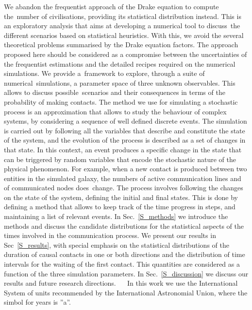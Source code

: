\documentclass[crop]{CSLB}
\begin{document}
We abandon the frequentist approach of the Drake equation to
compute the number of civilisations, providing its statistical
distribution instead.
%
This is an exploratory analysis that aims at developing a numerical
tool to discuss the different scenarios based on statistical
heuristics.
%
With this, we avoid the several theoretical problems
summarised by the Drake equation factors.
%
The approach proposed here should be considered as a compromise
between the uncertainties of the frequentist estimations and the detailed
recipes required on the numerical simulations.
%
We provide a framework to explore, through a suite of
numerical simulations, a parameter space of three unknown observables.
%
This allows to discuss possible scenarios and their consequences in
terms of the probability of making contacts.
%
The method we use for simulating a stochastic process is an
approximation that allows to study the behaviour of complex systems,
by considering a sequence of well defined discrete events.
%
The simulation is carried out by following all the variables that
describe and constitute the state of the system, and the evolution of
the process is described as a set of changes in that state.
%
In this context, an event produces a specific change in the state that
can be triggered by random variables that encode the stochastic nature
of the physical phenomenon.
%
For example, when a new contact is produced between two entities in
the simulated galaxy, the numbers of active communication lines and of
communicated nodes does change.
%
The process involves following the changes on the state of the system,
defining the initial and final states.
%
This is done by defining a method that allows to keep track of the
time progress in steps, and maintaining a list of relevant events.
%
In Sec.~\ref{S_methods} we introduce the methods and discuss the
candidate distributions for the statistical aspects of the times
involved in the communication process.
%
We present our results in Sec~\ref{S_results}, with special emphasis
on the statistical distributions of the duration of causal contacts in
one or both directions and the distribution of time intervals for the
waiting of the first contact.
%
This quantities are considered as a function of the three simulation
parameters.
%
In Sec.~\ref{S_discussion} we discuss our results and future research
directions.   
%
In this work we use the International System of units recommended by
the International Astronomial Union, where the simbol for years is
''a''.
\end{document}
